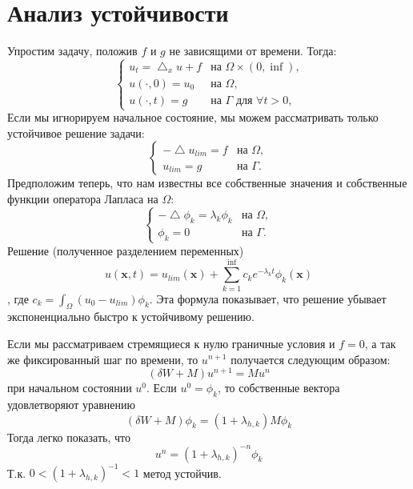 \documentclass[paper=a4, fontsize=13pt]{scrartcl} %
\numberwithin{equation}{section} %
\numberwithin{figure}{section} %
\numberwithin{table}{section} %
\begin{document}
\section{Анализ устойчивости}
Упростим задачу, положив $f$ и $g$ не зависящими от времени. Тогда:
    \[
        \begin{cases}
            u_t = \bigtriangleup_x u + f& \text{на $\Omega \times (0, \inf)$,} \\
            u(\cdot, 0) = u_0& \text{на $\Omega$}, \\
            u(\cdot, t) = g& \text{на $\Gamma$ для $\forall t > 0$,}
        \end{cases}
    \]
Если мы игнорируем начальное состояние, мы можем рассматривать только устойчивое решение задачи:
    \[
        \begin{cases}
            -\bigtriangleup u_{lim} = f& \text{на $\Omega$}, \\
            u_{lim} = g& \text{на $\Gamma$.}
        \end{cases}
    \]
Предположим теперь, что нам известны все собственные значения и собственные функции оператора Лапласа на $\Omega$:
    \[
        \begin{cases}
            -\bigtriangleup \phi_k = \lambda_k \phi_k& \text{на $\Omega$}, \\
            \phi_k = 0& \text{на $\Gamma$.}
        \end{cases}
    \]
Решение (полученное разделением переменных) $$u(\bm{x}, t) = u_{lim}(\bm{x}) + \sum_{k=1}^{\inf} c_k e^{-\lambda_k t} \phi_k(\bm{x})$$, где $c_k = \int _\Omega (u_0 - u_{lim}) \phi_k$. Эта формула показывает, что решение убывает экспоненциально быстро к устойчивому решению.

Если мы рассматриваем стремящиеся к нулю граничные условия и $f = 0$, а так же фиксированный шаг по времени, то $u^{n+1}$ получается следующим образом: $$(\delta W + M) u^{n+1} = M u^n$$ при начальном состоянии $u^0$. Если $u^0 = \phi_k$, то собственные вектора удовлетворяют уравнению $$(\delta W + M) \phi_k = (1 + \lambda_{h, k}) M \phi_k$$ Тогда легко показать, что $$u^n = (1 + \lambda_{h, k})^{-n} \phi_k$$ Т.к. $0 < (1 + \lambda_{h, k})^{-1} < 1$ метод устойчив.

\newpage
\end{document}
